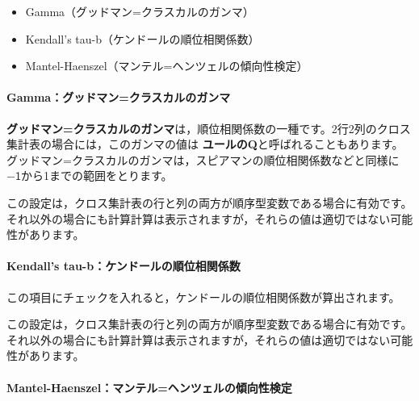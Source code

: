 \documentclass[
  12pt,
  a5jpaper,
  lualatex, ja=standard]{bxjsbook}
\providecommand{\tightlist}{%
  \setlength{\itemsep}{0pt}\setlength{\parskip}{0pt}}
\renewcommand{\emph}[1]{\textbf{\color{emph} #1}}
\newenvironment{jmvsettings}{%
	\begin{center}%
	\begin{tcolorbox}[%
		title=設定項目,
		colframe=gmoji,
		colbacktitle=gmoji,
		colback=gmoji!2!white,
		breakable,
		width=.9\textwidth,
		]\small\addtolength{\leftmargini}{-3\labelsep}%
	}%
	{\end{tcolorbox}\end{center}}
\begin{document}
\begin{jmvsettings}

\begin{itemize}
\tightlist
\item
  Gamma（グッドマン=クラスカルのガンマ）
\item
  Kendall's tau-b（ケンドールの順位相関係数）
\item
  Mantel-Haenszel（マンテル=ヘンツェルの傾向性検定）
\end{itemize}

\end{jmvsettings}

\hypertarget{gammaux30b0ux30c3ux30c9ux30deux30f3ux30afux30e9ux30b9ux30abux30ebux306eux30acux30f3ux30de}{%
\paragraph*{Gamma：グッドマン=クラスカルのガンマ}\label{gammaux30b0ux30c3ux30c9ux30deux30f3ux30afux30e9ux30b9ux30abux30ebux306eux30acux30f3ux30de}}

\emph{グッドマン=クラスカルのガンマ}は，順位相関係数の一種です。2行2列のクロス集計表の場合には，このガンマの値は\emph{ユールのQ}と呼ばれることもあります。グッドマン=クラスカルのガンマは，スピアマンの順位相関係数などと同様に\(-\textsf{1}\)から1までの範囲をとります。

この設定は，クロス集計表の行と列の両方が順序型変数である場合に有効です。それ以外の場合にも計算計算は表示されますが，それらの値は適切ではない可能性があります。

\hypertarget{kendalls-tau-bux30b1ux30f3ux30c9ux30fcux30ebux306eux9806ux4f4dux76f8ux95a2ux4fc2ux6570-1}{%
\paragraph*{Kendall's tau-b：ケンドールの順位相関係数}\label{kendalls-tau-bux30b1ux30f3ux30c9ux30fcux30ebux306eux9806ux4f4dux76f8ux95a2ux4fc2ux6570-1}}

この項目にチェックを入れると，ケンドールの順位相関係数が算出されます。

この設定は，クロス集計表の行と列の両方が順序型変数である場合に有効です。それ以外の場合にも計算計算は表示されますが，それらの値は適切ではない可能性があります。

\hypertarget{mantel-haenszelux30deux30f3ux30c6ux30ebux30d8ux30f3ux30c4ux30a7ux30ebux306eux50beux5411ux6027ux691cux5b9a}{%
\paragraph*{Mantel-Haenszel：マンテル=ヘンツェルの傾向性検定}\label{mantel-haenszelux30deux30f3ux30c6ux30ebux30d8ux30f3ux30c4ux30a7ux30ebux306eux50beux5411ux6027ux691cux5b9a}}
\end{document}
